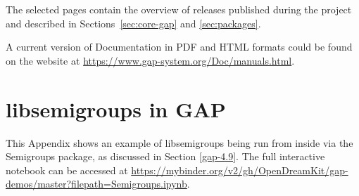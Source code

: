 \documentclass{deliverablereport}
\begin{document}
The selected pages contain the overview of \GAP releases published
during the project and described in Sections~\ref{sec:core-gap} and \ref{sec:packages}.

A current version of \GAP Documentation in PDF and HTML formats
could be found on the \GAP website at \url{https://www.gap-system.org/Doc/manuals.html}.

%



\section{libsemigroups in GAP}
\label{sec:libsemigroups-notebook}

This Appendix shows an example of {\sf libsemigroups} being run from inside
\GAP via the {\sf Semigroups} package, as discussed in Section \ref{gap-4.9}.
The full interactive notebook can be accessed at
\url{https://mybinder.org/v2/gh/OpenDreamKit/gap-demos/master?filepath=Semigroups.ipynb}.

\vspace{1.0em}
\end{document}

